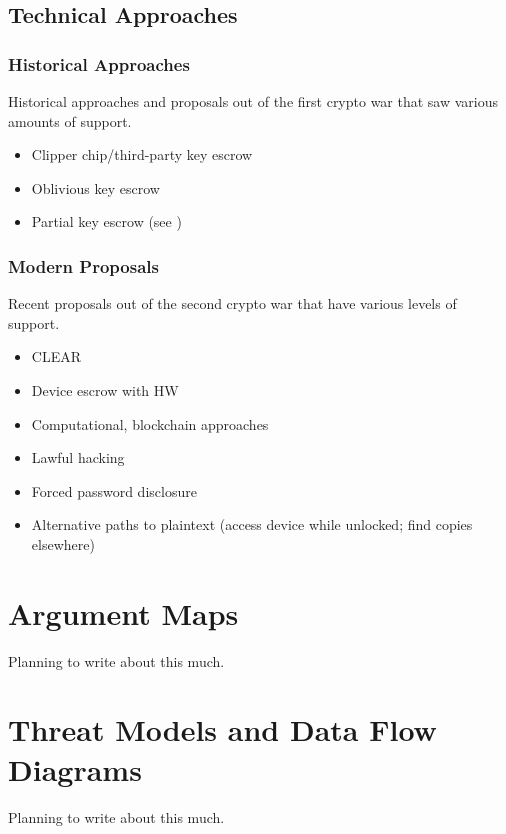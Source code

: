 \subsection{Technical Approaches}
\label{sec-tech-approaches}

\subsubsection*{Historical Approaches}

Historical approaches and proposals out of the first crypto war that saw various amounts of support.

\begin{itemize}
    \item Clipper chip/third-party key escrow \cite{blaze_protocol_1994}
    \item Oblivious key escrow \cite{goos_oblivious_1996}
    \item Partial key escrow (see \cite{denning_taxonomy_1996})
\end{itemize}

\subsubsection*{Modern Proposals}

Recent proposals out of the second crypto war that have various levels of support.

\begin{itemize}
    \item CLEAR \cite{ozzie_2018}
    \item Device escrow with HW \cite{savage_lawful_2018}
    \item Computational, blockchain approaches \cite{phan_key_2017}
    \item Lawful hacking \cite{nguyen_lawful_2017} \cite{soesanto_2018} \cite{kerr_encryption_2017}
    \item Forced password disclosure \cite{bittenbender_2019} \cite{kerr_encryption_2017}
    \item Alternative paths to plaintext (access device while unlocked; find copies elsewhere)
        \cite{kerr_encryption_2017}
\end{itemize}

\section{Argument Maps}
\label{sec-arg-maps-intro}

{\color{red} Planning to write about this much.} \lipsum[40]

\lipsum[40]

\section{Threat Models and Data Flow Diagrams}
\label{sec-threat-model-intro}

{\color{red} Planning to write about this much.} \lipsum[40]

\lipsum[40]

\lipsum[40]
